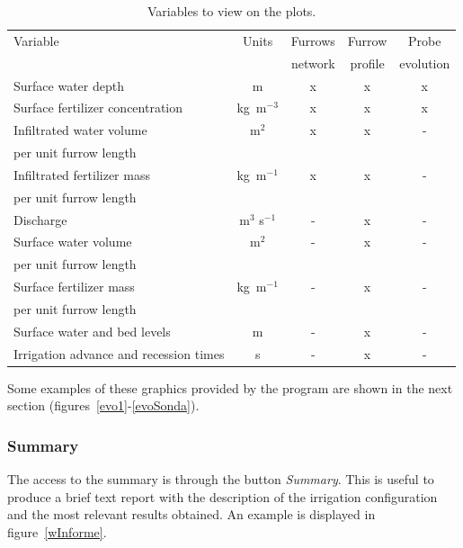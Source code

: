 \documentclass[review,authoryear]{elsarticle}
\begin{document}
\begin{table}[ht]\footnotesize
\caption{Variables to view on the plots.}
\label{tableVariables}
\begin{center}
\begin{tabular}{lcccc}
\hline
Variable & Units & Furrows & Furrow & Probe \\
& & network & profile & evolution\\
\hline
Surface water depth & m & x & x & x \\
Surface fertilizer concentration & kg~m$^{-3}$ & x & x & x \\
Infiltrated water volume & m$^2$ & x & x & - \\
\hspace{3mm} per unit furrow length \\
Infiltrated fertilizer mass & kg~m$^{-1}$ & x & x & - \\
\hspace{3mm} per unit furrow length \\
Discharge & m$^3$ s$^{-1}$ & - & x & - \\
Surface water volume & m$^2$ & - & x & - \\
\hspace{3mm} per unit furrow length \\
Surface fertilizer mass & kg~m$^{-1}$ & - & x & - \\
\hspace{3mm} per unit furrow length \\
Surface water and bed levels & m & - & x & - \\
Irrigation advance and recession times & s & - & x & - \\
\hline
\end{tabular}
\end{center}
\end{table}

Some examples of these graphics provided by the program are shown in the next
section (figures~\ref{evo1}-\ref{evoSonda}).

\subsubsection{Summary}

The access to the summary is through the button \emph{Summary}. This is useful
to produce a brief text report with the description of the irrigation
configuration and the most relevant results obtained. An example is displayed in
figure~\ref{wInforme}.
\end{document}
